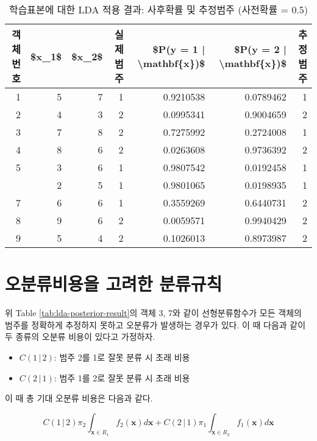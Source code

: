 \documentclass[
]{book}
\providecommand{\tightlist}{%
  \setlength{\itemsep}{0pt}\setlength{\parskip}{0pt}}
\begin{document}
\begin{table}

\caption{\label{tab:lda-posterior-result-equal-prior}학습표본에 대한 LDA 적용 결과: 사후확률 및 추정범주 (사전확률 = 0.5)}
\centering
\begin{tabular}[t]{rrrrrrr}
\toprule
객체번호 & \$x\_1\$ & \$x\_2\$ & 실제범주 & \$P(y = 1 | \textbackslash{}mathbf\{x\})\$ & \$P(y = 2 | \textbackslash{}mathbf\{x\})\$ & 추정범주\\
\midrule
1 & 5 & 7 & 1 & 0.9210538 & 0.0789462 & 1\\
2 & 4 & 3 & 2 & 0.0995341 & 0.9004659 & 2\\
3 & 7 & 8 & 2 & 0.7275992 & 0.2724008 & 1\\
4 & 8 & 6 & 2 & 0.0263608 & 0.9736392 & 2\\
5 & 3 & 6 & 1 & 0.9807542 & 0.0192458 & 1\\
\addlinespace
6 & 2 & 5 & 1 & 0.9801065 & 0.0198935 & 1\\
7 & 6 & 6 & 1 & 0.3559269 & 0.6440731 & 2\\
8 & 9 & 6 & 2 & 0.0059571 & 0.9940429 & 2\\
9 & 5 & 4 & 2 & 0.1026013 & 0.8973987 & 2\\
\bottomrule
\end{tabular}
\end{table}

\hypertarget{lda-misclassification-cost}{%
\section{오분류비용을 고려한 분류규칙}\label{lda-misclassification-cost}}

위 Table \ref{tab:lda-posterior-result}의 객체 3, 7와 같이 선형분류함수가 모든 객체의 범주를 정확하게 추정하지 못하고 오분류가 발생하는 경우가 있다. 이 때 다음과 같이 두 종류의 오분류 비용이 있다고 가정하자.

\begin{itemize}
\tightlist
\item
  \(C(1 \, | \, 2)\): 범주 2를 1로 잘못 분류 시 초래 비용
\item
  \(C(2 \, | \, 1)\): 범주 1를 2로 잘못 분류 시 초래 비용
\end{itemize}

이 때 총 기대 오분류 비용은 다음과 같다.

\begin{equation}
C(1 \, | \, 2) \pi_2 \int_{\mathbf{x} \in R_1} f_2(\mathbf{x}) d\mathbf{x} + C(2 \, | \, 1) \pi_1 \int_{\mathbf{x} \in R_2} f_1(\mathbf{x}) d\mathbf{x}
\label{eq:expected-misclassification-cost}
\end{equation}
\end{document}
